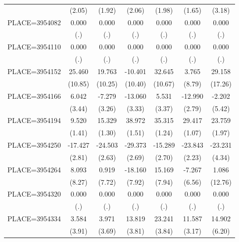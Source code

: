 {\begin{tabular}{l*{6}{c}}
                    &      (2.05)&      (1.92)&      (2.06)&      (1.98)&      (1.65)&      (3.18)\\
PLACE=3954082       &       0.000&       0.000&       0.000&       0.000&       0.000&       0.000\\
                    &         (.)&         (.)&         (.)&         (.)&         (.)&         (.)\\
PLACE=3954110       &       0.000&       0.000&       0.000&       0.000&       0.000&       0.000\\
                    &         (.)&         (.)&         (.)&         (.)&         (.)&         (.)\\
PLACE=3954152       &      25.460&      19.763&     -10.401&      32.645&       3.765&      29.158\\
                    &     (10.85)&     (10.25)&     (10.40)&     (10.67)&      (8.79)&     (17.26)\\
PLACE=3954166       &       6.042&      -7.279&     -13.060&       5.531&     -12.990&      -2.202\\
                    &      (3.44)&      (3.26)&      (3.33)&      (3.37)&      (2.79)&      (5.42)\\
PLACE=3954194       &       9.520&      15.329&      38.972&      35.315&      29.417&      23.759\\
                    &      (1.41)&      (1.30)&      (1.51)&      (1.24)&      (1.07)&      (1.97)\\
PLACE=3954250       &     -17.427&     -24.503&     -29.373&     -15.289&     -23.843&     -23.231\\
                    &      (2.81)&      (2.63)&      (2.69)&      (2.70)&      (2.23)&      (4.34)\\
PLACE=3954264       &       8.093&       0.919&     -18.160&      15.169&      -7.267&       1.086\\
                    &      (8.27)&      (7.72)&      (7.92)&      (7.94)&      (6.56)&     (12.76)\\
PLACE=3954320       &       0.000&       0.000&       0.000&       0.000&       0.000&       0.000\\
                    &         (.)&         (.)&         (.)&         (.)&         (.)&         (.)\\
PLACE=3954334       &       3.584&       3.971&      13.819&      23.241&      11.587&      14.902\\
                    &      (3.91)&      (3.69)&      (3.81)&      (3.84)&      (3.17)&      (6.20)\\

\end{tabular}}

